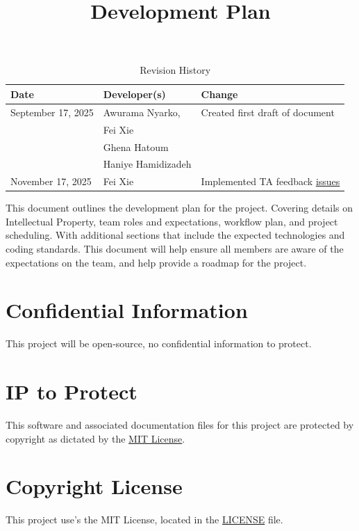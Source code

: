\documentclass{article}
\title{Development Plan\\\progname}
\author{\authname}
\date{}
\begin{document}
\maketitle

\begin{table}[hp]
\caption{Revision History} \label{TblRevisionHistory}
\begin{tabularx}{\textwidth}{llX}
\toprule
\textbf{Date} & \textbf{Developer(s)} & \textbf{Change}\\
\midrule
September 17, 2025 & Awurama Nyarko, & Created first draft of document
 \\ & Fei Xie &
 \\ &Ghena Hatoum &
 \\ &Haniye Hamidizadeh &
\\November 17, 2025 & Fei Xie & Implemented TA feedback \href{https://github.com/thaafei/DomainX/issues/52}{issues}\\
\bottomrule
\end{tabularx}
\end{table}

\newpage{}
This document outlines the development plan for the project. Covering details on Intellectual Property, team roles and expectations, workflow plan, and project scheduling.
With additional sections that include the expected technologies and coding standards. This document will help ensure all members are aware of the expectations on the team, and help provide a roadmap for the project.

\section{Confidential Information}
This project will be open-source, no confidential information to protect.

\section{IP to Protect}
This software and associated documentation files for this project are protected by copyright as dictated by the \href{https://github.com/thaafei/DomainX/blob/main/LICENSE}{MIT License}.

\section{Copyright License}
This project use's the MIT License, located in the \href{https://github.com/thaafei/DomainX/blob/main/LICENSE}{LICENSE} file.
\end{document}
